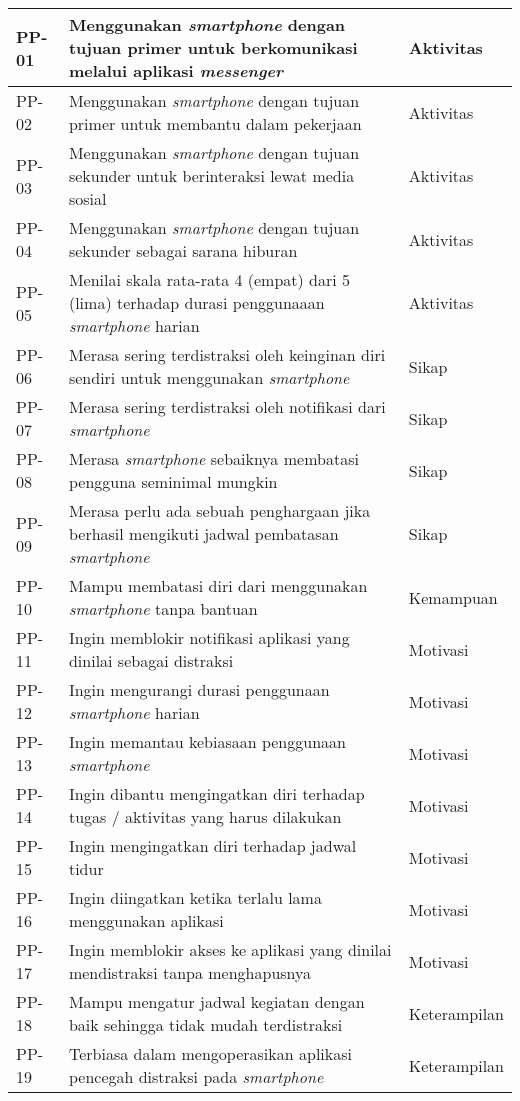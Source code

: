 \begin{small}
\begin{longtable}[c]{|W{c}{0.07\textwidth}|>{\ccnormspacing}m{0.66\textwidth}|>{\ccnormspacingcenter}m{0.165\textwidth}|}
  PP-01  &  Menggunakan \textit{smartphone} dengan tujuan primer untuk berkomunikasi melalui aplikasi \textit{messenger}  & Aktivitas \\ \hline
  PP-02  &  Menggunakan \textit{smartphone} dengan tujuan primer untuk membantu dalam pekerjaan & Aktivitas \\ \hline
  PP-03  &  Menggunakan \textit{smartphone} dengan tujuan sekunder untuk berinteraksi lewat media sosial & Aktivitas \\ \hline
  PP-04  &  Menggunakan \textit{smartphone} dengan tujuan sekunder sebagai sarana hiburan & Aktivitas \\ \hline
  PP-05  &  Menilai skala rata-rata 4 (empat) dari 5 (lima) terhadap durasi penggunaaan \textit{smartphone} harian & Aktivitas \\ \hline
  PP-06  &  Merasa sering terdistraksi oleh keinginan diri sendiri untuk menggunakan \textit{smartphone}  & Sikap \\ \hline
  PP-07  &  Merasa sering terdistraksi oleh notifikasi dari \textit{smartphone} & Sikap \\ \hline
  PP-08  &  Merasa \textit{smartphone} sebaiknya membatasi pengguna seminimal mungkin & Sikap \\ \hline
  PP-09  &  Merasa perlu ada sebuah penghargaan jika berhasil mengikuti jadwal pembatasan \textit{smartphone} & Sikap \\ \hline
  PP-10  &  Mampu membatasi diri dari menggunakan \textit{smartphone} tanpa bantuan & Kemampuan \\ \hline
  PP-11  &  Ingin memblokir notifikasi aplikasi yang dinilai sebagai distraksi & Motivasi \\ \hline
  PP-12  &  Ingin mengurangi durasi penggunaan \textit{smartphone} harian & Motivasi \\ \hline
  PP-13  &  Ingin memantau kebiasaan penggunaan \textit{smartphone} & Motivasi \\ \hline
  PP-14  &  Ingin dibantu mengingatkan diri terhadap tugas / aktivitas yang harus dilakukan & Motivasi \\ \hline
  PP-15  &  Ingin mengingatkan diri terhadap jadwal tidur & Motivasi \\ \hline
  PP-16  &  Ingin diingatkan ketika terlalu lama menggunakan aplikasi & Motivasi \\ \hline
  PP-17  &  Ingin memblokir akses ke aplikasi yang dinilai mendistraksi tanpa menghapusnya & Motivasi \\ \hline
  PP-18  &  Mampu mengatur jadwal kegiatan dengan baik sehingga tidak mudah terdistraksi & Keterampilan \\ \hline
  PP-19  &  Terbiasa dalam mengoperasikan aplikasi pencegah distraksi pada \textit{smartphone}  & Keterampilan \\ \hline
\end{longtable}
\end{small}
\justifying
\FloatBarrier

